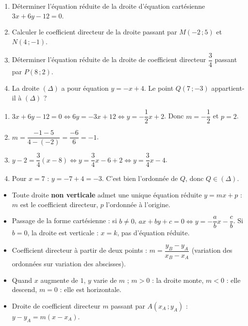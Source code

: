 \documentclass[11pt]{article}
\begin{document}
\begin{exercice}
\begin{enumerate}
\item Déterminer l'équation réduite de la droite d'équation cartésienne $3x + 6y - 12 = 0$.
\item Calculer le coefficient directeur de la droite passant par $M(-2\,; 5)$ et $N(4\,; -1)$.
\item Déterminer l'équation réduite de la droite de coefficient directeur $\dfrac{3}{4}$ passant par $P(8\,; 2)$.
\item La droite $(\Delta)$ a pour équation $y = -x + 4$. Le point $Q(7\,; -3)$ appartient-il à $(\Delta)$ ?
\end{enumerate}
\end{exercice}

\begin{corrige}[Exercice 1]
\begin{enumerate}
\item $3x + 6y - 12 = 0 \Leftrightarrow 6y = -3x + 12 \Leftrightarrow y = -\dfrac{1}{2}x + 2$. Donc $m = -\dfrac{1}{2}$ et $p = 2$.
\item $m = \dfrac{-1 - 5}{4 - (-2)} = \dfrac{-6}{6} = -1$.
\item $y - 2 = \dfrac{3}{4}(x - 8) \Leftrightarrow y = \dfrac{3}{4}x - 6 + 2 \Leftrightarrow y = \dfrac{3}{4}x - 4$.
\item Pour $x = 7$ : $y = -7 + 4 = -3$. C'est bien l'ordonnée de $Q$, donc $Q \in (\Delta)$.
\end{enumerate}
\end{corrige}

\begin{aretenir}
\begin{itemize}
\item Toute droite \textbf{non verticale} admet une unique équation réduite $y = mx + p$ : $m$ est le coefficient directeur, $p$ l'ordonnée à l'origine.
\item Passage de la forme cartésienne : si $b \neq 0$, $ax + by + c = 0 \Leftrightarrow y = -\dfrac{a}{b}x - \dfrac{c}{b}$. Si $b = 0$, la droite est verticale : $x = k$, pas d'équation réduite.
\item Coefficient directeur à partir de deux points : $m = \dfrac{y_B - y_A}{x_B - x_A}$ (variation des ordonnées sur variation des abscisses).
\item Quand $x$ augmente de $1$, $y$ varie de $m$ ; $m > 0$ : la droite monte, $m < 0$ : elle descend, $m = 0$ : elle est horizontale.
\item Droite de coefficient directeur $m$ passant par $A(x_A\,; y_A)$ : $y - y_A = m(x - x_A)$.
\end{itemize}
\end{aretenir}
\end{document}
